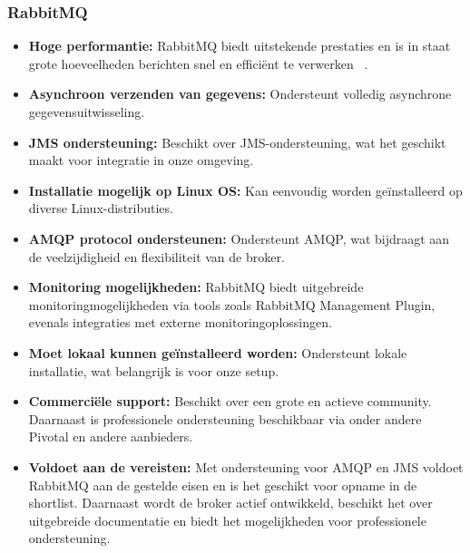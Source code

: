 \subsubsection{RabbitMQ}
\begin{itemize}
    \item \textbf{Hoge performantie:} RabbitMQ biedt uitstekende prestaties en is in staat grote hoeveelheden berichten snel en efficiënt te verwerken ~\autocite{baeldung2024}.
    \item \textbf{Asynchroon verzenden van gegevens:} Ondersteunt volledig asynchrone gegevensuitwisseling.
    \item \textbf{JMS ondersteuning:} Beschikt over JMS-ondersteuning, wat het geschikt maakt voor integratie in onze omgeving.
    \item \textbf{Installatie mogelijk op Linux OS:} Kan eenvoudig worden geïnstalleerd op diverse Linux-distributies.
    \item \textbf{AMQP protocol ondersteunen:} Ondersteunt AMQP, wat bijdraagt aan de veelzijdigheid en flexibiliteit van de broker.
    \item \textbf{Monitoring mogelijkheden:} RabbitMQ biedt uitgebreide monitoringmogelijkheden via tools zoals RabbitMQ Management Plugin, evenals integraties met externe monitoringoplossingen.
    \item \textbf{Moet lokaal kunnen geïnstalleerd worden:} Ondersteunt lokale installatie, wat belangrijk is voor onze setup.
    \item \textbf{Commerciële support:} Beschikt over een grote en actieve community. Daarnaast is professionele ondersteuning beschikbaar via onder andere Pivotal en andere aanbieders.
    \item \textbf{Voldoet aan de vereisten:} Met ondersteuning voor AMQP en JMS voldoet RabbitMQ aan de gestelde eisen en is het geschikt voor opname in de shortlist. 
    Daarnaast wordt de broker actief ontwikkeld, beschikt het over uitgebreide documentatie en biedt het mogelijkheden voor professionele ondersteuning.
\end{itemize}
  
